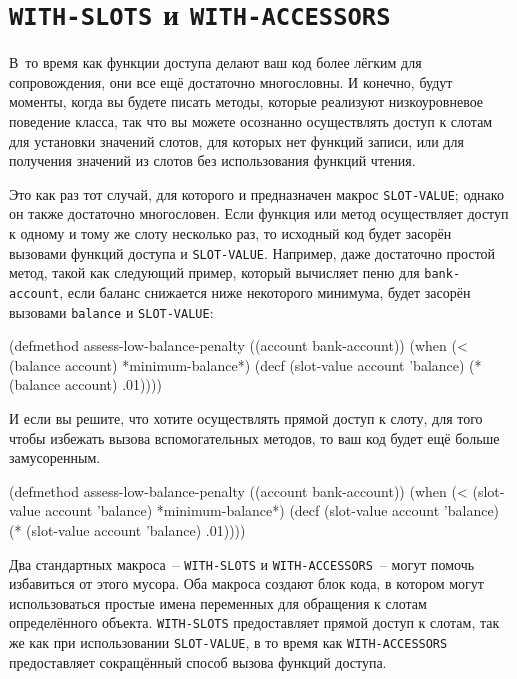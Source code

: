 \section{\texttt{WITH-SLOTS} и \texttt{WITH-ACCESSORS}}

В~то время как функции доступа делают ваш код более лёгким для сопровождения, они все ещё
достаточно многословны.  И конечно, будут моменты, когда вы будете писать методы, которые
реализуют низкоуровневое поведение класса, так что вы можете осознанно осуществлять доступ
к слотам для установки значений слотов, для которых нет функций записи, или для получения
значений из слотов без использования функций чтения.

Это как раз тот случай, для которого и предназначен макрос \lstinline{SLOT-VALUE}; однако он
также достаточно многословен.  Если функция или метод осуществляет доступ к одному и тому
же слоту несколько раз, то исходный код будет засорён вызовами функций доступа и
\lstinline{SLOT-VALUE}.  Например, даже достаточно простой метод, такой как следующий пример,
который вычисляет пеню для \lstinline{bank-account}, если баланс снижается ниже некоторого
минимума, будет засорён вызовами \lstinline{balance} и \lstinline{SLOT-VALUE}:

\begin{myverb}
(defmethod assess-low-balance-penalty ((account bank-account))
  (when (< (balance account) *minimum-balance*)
    (decf (slot-value account 'balance) (* (balance account) .01))))
\end{myverb}

И если вы решите, что хотите осуществлять прямой доступ к слоту, для того чтобы
избежать вызова вспомогательных методов, то ваш код будет ещё больше замусоренным.

\begin{myverb}
(defmethod assess-low-balance-penalty ((account bank-account))
  (when (< (slot-value account 'balance) *minimum-balance*)
    (decf (slot-value account 'balance) (* (slot-value account 'balance) .01))))
\end{myverb}

Два стандартных макроса~-- \lstinline{WITH-SLOTS} и \lstinline{WITH-ACCESSORS}~-- могут помочь
избавиться от этого мусора.  Оба макроса создают блок кода, в котором могут использоваться
простые имена переменных для обращения к слотам определённого объекта.  \lstinline{WITH-SLOTS}
предоставляет прямой доступ к слотам, так же как при использовании \lstinline{SLOT-VALUE}, в то
время как \lstinline{WITH-ACCESSORS} предоставляет сокращённый способ вызова функций доступа.

